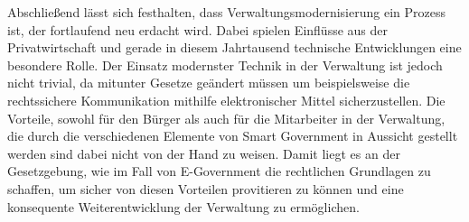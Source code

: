 Abschließend lässt sich festhalten, dass Verwaltungsmodernisierung ein Prozess ist, der fortlaufend neu erdacht wird.
Dabei spielen Einflüsse aus der Privatwirtschaft und gerade in diesem Jahrtausend technische Entwicklungen eine besondere Rolle.
Der Einsatz modernster Technik in der Verwaltung ist jedoch nicht trivial, da mitunter Gesetze geändert müssen um beispielsweise die rechtssichere Kommunikation mithilfe elektronischer Mittel sicherzustellen.
Die Vorteile, sowohl für den Bürger als auch für die Mitarbeiter in der Verwaltung, die durch die verschiedenen Elemente von Smart Government in Aussicht gestellt werden sind dabei nicht von der Hand zu weisen.
Damit liegt es an der Gesetzgebung, wie im Fall von E-Government die rechtlichen Grundlagen zu schaffen, um sicher von diesen Vorteilen provitieren zu können und eine konsequente Weiterentwicklung der Verwaltung zu ermöglichen.

% 
% 
% 
% 

